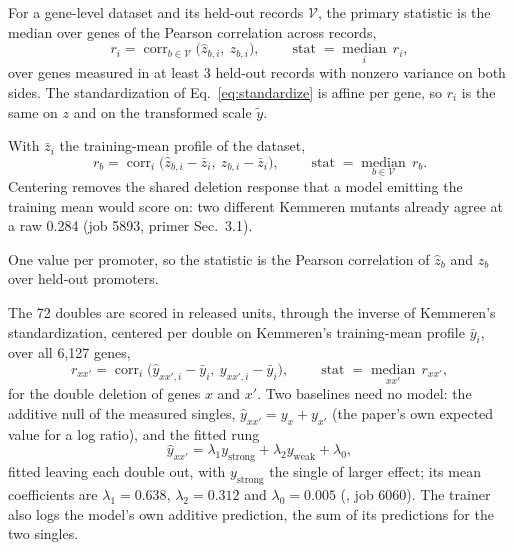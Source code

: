 For a gene-level dataset and its held-out records $\mathcal{V}$, the primary statistic is
the median over genes of the Pearson correlation across records,
\begin{equation}
r_i = \operatorname{corr}_{b \in \mathcal{V}}\big(\hat z_{b,i},\ z_{b,i}\big),
\qquad
\operatorname{stat} = \operatorname*{median}_{i}\, r_i,
\label{eq:pergene}
\end{equation}
over genes measured in at least 3 held-out records with nonzero variance on both sides. The
standardization of Eq.~\ref{eq:standardize} is affine per gene, so $r_i$ is the same on
$z$ and on the transformed scale $\tilde y$.

With $\bar z_i$ the training-mean profile of the dataset,
\begin{equation}
r_b = \operatorname{corr}_{i}\big(\hat z_{b,i} - \bar z_i,\ z_{b,i} - \bar z_i\big),
\qquad
\operatorname{stat} = \operatorname*{median}_{b \in \mathcal{V}}\, r_b.
\label{eq:perstrain}
\end{equation}
Centering removes the shared deletion response that a model emitting the training mean
would score on: two different Kemmeren mutants already agree at a raw 0.284 (job 5893,
primer Sec.\ 3.1).

One value per promoter, so the statistic is the Pearson correlation of $\hat z_b$ and
$z_b$ over held-out promoters.

The 72 doubles are scored in released units, through the inverse of Kemmeren's
standardization, centered per double on Kemmeren's training-mean profile $\bar y_i$, over all
6{,}127 genes,
\begin{equation}
r_{xx'} = \operatorname{corr}_{i}\big(\hat y_{xx',i} - \bar y_i,\ y_{xx',i} - \bar y_i\big),
\qquad
\operatorname{stat} = \operatorname*{median}_{xx'}\, r_{xx'},
\label{eq:doubles}
\end{equation}
for the double deletion of genes $x$ and $x'$. Two baselines need no model: the additive
null of the measured singles, $\hat y_{xx'} = y_x + y_{x'}$ (the paper's own expected value
for a log ratio), and the fitted rung
\begin{equation}
\hat y_{xx'} = \lambda_1 y_{\mathrm{strong}} + \lambda_2 y_{\mathrm{weak}} + \lambda_0,
\label{eq:fitted}
\end{equation}
fitted leaving each double out, with $y_{\mathrm{strong}}$ the single of larger effect; its
mean coefficients are $\lambda_1 = 0.638$, $\lambda_2 = 0.312$ and $\lambda_0 = 0.005$
(, job 6060). The trainer also logs the model's own
additive prediction, the sum of its predictions for the two singles.

